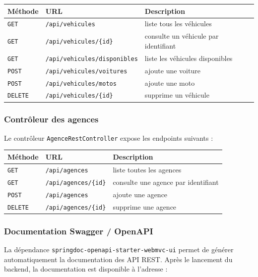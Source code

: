 \documentclass[12pt,a4paper]{article}
\newcommand{\code}[1]{\texttt{#1}}
\begin{document}
\begin{longtable}{|p{4cm}|p{5cm}|p{6cm}|}
\hline
\textbf{Méthode} & \textbf{URL} & \textbf{Description} \\
\hline
\code{GET} & \code{/api/vehicules} & liste tous les véhicules \\
\hline
\code{GET} & \code{/api/vehicules/\{id\}} & consulte un véhicule par identifiant \\
\hline
\code{GET} & \code{/api/vehicules/disponibles} & liste les véhicules disponibles \\
\hline
\code{POST} & \code{/api/vehicules/voitures} & ajoute une voiture \\
\hline
\code{POST} & \code{/api/vehicules/motos} & ajoute une moto \\
\hline
\code{DELETE} & \code{/api/vehicules/\{id\}} & supprime un véhicule \\
\hline
\end{longtable}

\subsubsection*{Contrôleur des agences}

Le contrôleur \code{AgenceRestController} expose les endpoints suivants :

\begin{longtable}{|p{4cm}|p{5cm}|p{6cm}|}
\hline
\textbf{Méthode} & \textbf{URL} & \textbf{Description} \\
\hline
\code{GET} & \code{/api/agences} & liste toutes les agences \\
\hline
\code{GET} & \code{/api/agences/\{id\}} & consulte une agence par identifiant \\
\hline
\code{POST} & \code{/api/agences} & ajoute une agence \\
\hline
\code{DELETE} & \code{/api/agences/\{id\}} & supprime une agence \\
\hline
\end{longtable}

\subsubsection*{Documentation Swagger / OpenAPI}

La dépendance \code{springdoc-openapi-starter-webmvc-ui} permet de générer automatiquement la documentation des API REST.
Après le lancement du backend, la documentation est disponible à l'adresse :
\end{document}
